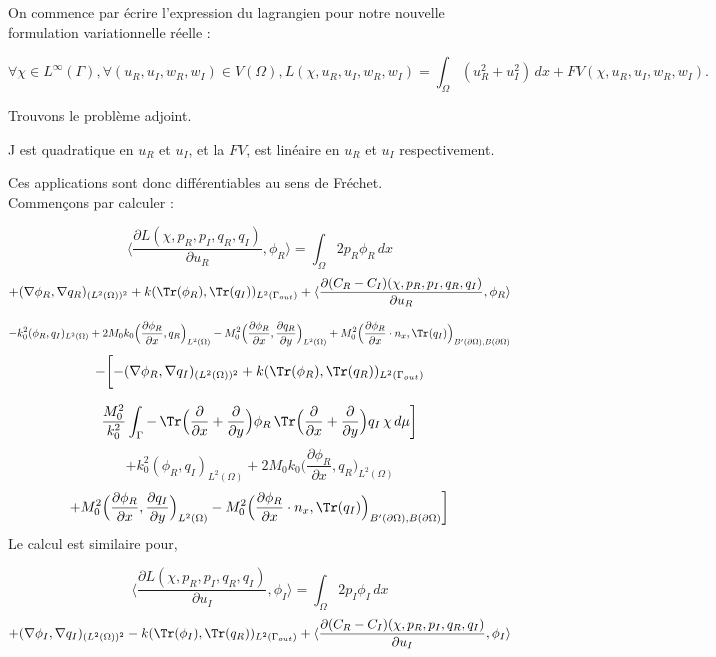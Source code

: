 On commence par écrire l'expression du lagrangien pour notre nouvelle formulation variationnelle réelle :

\begin{equation}
\forall \chi \in L^{\infty}(\Gamma), \forall (u_R, u_I, w_R, w_I) \in V(\Omega), L(\chi, u_R, u_I, w_R, w_I) = \int_{\Omega} (u_R^2 + u_I^2) \,dx + FV(\chi, u_R, u_I, w_R, w_I).
\end{equation}



Trouvons le problème adjoint. 

J est quadratique en \(u_R\) et \(u_I\), et la  \(FV\), est linéaire en \(u_R\) et \(u_I\) respectivement. 

Ces applications sont donc différentiables au sens de Fréchet.\\
Commen\c cons par calculer :

\[
\langle \frac{\partial L(\chi, p_R, p_I, q_R, q_I)}{\partial u_R}, \phi_R\rangle = \int_{\Omega} 2 p_R \phi_R \,dx 
\]
\[
+(\nabla \phi_R, \nabla q_R)_{(L^2(\Omega))^2} + k(\Tr(\phi_R),\Tr(q_I))_{L^2(\Gamma_{out})}+\langle \frac{\partial (C_R-C_I)(\chi, p_R, p_I, q_R, q_I)}{\partial u_R}, \phi_R\rangle
\]

\[
-k_0^2(\phi_R,q_I)_{L^2(\Omega)}+ 
2M_0k_0\Big(\frac{\partial \phi_R}{\partial x}, q_R\Big)_{L^2(\Omega)}
-M_0^2\Big(\frac{\partial \phi_R}{\partial x},\frac{\partial q_R}{\partial y}\Big)_{L^2(\Omega)}+ M_0^2\Big(\frac{\partial \phi_R}{\partial x}\cdot n_x,\Tr(q_I)\Big)_{B'(\partial \Omega),B(\partial \Omega)}
\]
\[
-\biggl[-(\nabla \phi_R, \nabla q_I)_{(L^2(\Omega))^2} + k(\Tr(\phi_R),\Tr(q_R))_{L^2(\Gamma_{out})}\]

\[
\frac{M_0^2}{k_0^2} \int_{\Gamma} - \operatorname{\Tr}\Bigl( \frac{\partial }{\partial x}+\frac{\partial }{\partial y}\Bigr)\phi_R \operatorname{\Tr}\Bigl( \frac{\partial }{\partial x}+\frac{\partial }{\partial y}\Bigr)q_I \, \chi \, d\mu \biggl]
\]
\[+k_0^2(\phi_R,q_I)_{L^2(\Omega)} + 2M_0k_0\Big(\frac{\partial \phi_R}{\partial x}, q_R\Big)_{L^2(\Omega)}\]
\[+M_0^2\Big(\frac{\partial \phi_R}{\partial x},\frac{\partial q_I}{\partial y}\Big)_{L^2(\Omega)}- M_0^2\Big(\frac{\partial \phi_R}{\partial x}\cdot n_x,\Tr(q_I)\Big)_{B'(\partial \Omega),B(\partial \Omega) } \biggl]
\]
Le calcul est similaire pour,

\[ 
\langle \frac{\partial L(\chi, p_R, p_I, q_R, q_I)}{\partial u_I}, \phi_I\rangle = \int_{\Omega} 2 p_I \phi_I \,dx \]
\[
+(\nabla \phi_I, \nabla q_I)_{(L^2(\Omega))^2}-k(\Tr(\phi_I),\Tr(q_R))_{L^2(\Gamma_{out})} + \langle \frac{\partial (C_R-C_I)(\chi, p_R, p_I, q_R, q_I)}{\partial u_I}, \phi_I\rangle\]

